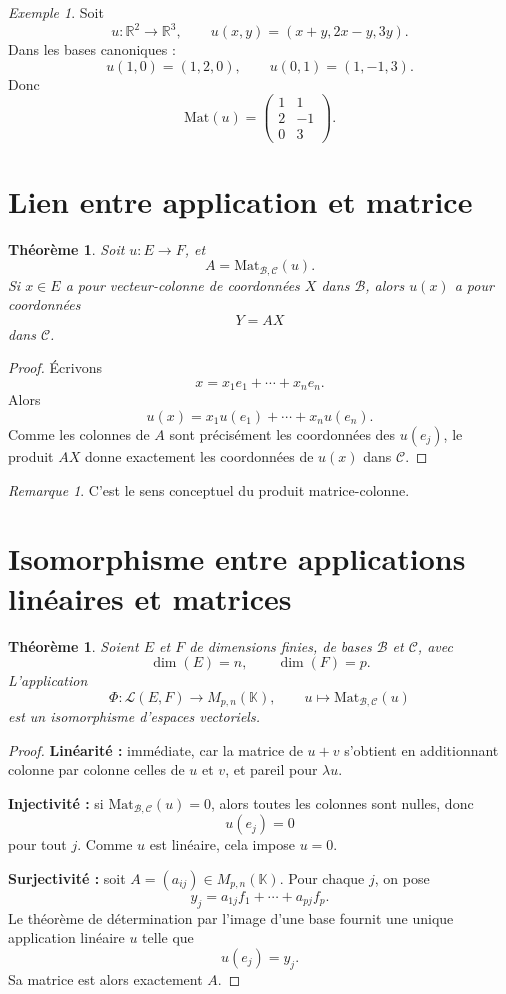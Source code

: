 \documentclass[11pt,a4paper]{article}
\newtheorem{theoreme}[definition]{Théorème}
\theoremstyle{remark}
\newtheorem{remarque}[definition]{Remarque}
\newtheorem{exemple}[definition]{Exemple}
\newcommand{\R}{\mathbb{R}}
\newcommand{\K}{\mathbb{K}}
\newcommand{\Lin}{\mathcal{L}}
\begin{document}
\begin{exemple}
Soit
\[
u:\R^2\to\R^3,\qquad u(x,y)=(x+y,2x-y,3y).
\]
Dans les bases canoniques :
\[
u(1,0)=(1,2,0),\qquad u(0,1)=(1,-1,3).
\]
Donc
\[
\mathrm{Mat}(u)=
\begin{pmatrix}
1 & 1\\
2 & -1\\
0 & 3
\end{pmatrix}.
\]
\end{exemple}

\section{Lien entre application et matrice}

\begin{theoreme}
Soit \(u:E\to F\), et
\[
A=\mathrm{Mat}_{\mathcal B,\mathcal C}(u).
\]
Si \(x\in E\) a pour vecteur-colonne de coordonnées \(X\) dans \(\mathcal B\), alors \(u(x)\) a pour coordonnées
\[
Y=AX
\]
dans \(\mathcal C\).
\end{theoreme}

\begin{proof}
Écrivons
\[
x=x_1e_1+\cdots+x_ne_n.
\]
Alors
\[
u(x)=x_1u(e_1)+\cdots+x_nu(e_n).
\]
Comme les colonnes de \(A\) sont précisément les coordonnées des \(u(e_j)\), le produit \(AX\) donne exactement les coordonnées de \(u(x)\) dans \(\mathcal C\).
\end{proof}

\begin{remarque}
C’est le sens conceptuel du produit matrice-colonne.
\end{remarque}

\section{Isomorphisme entre applications linéaires et matrices}

\begin{theoreme}
Soient \(E\) et \(F\) de dimensions finies, de bases \(\mathcal B\) et \(\mathcal C\), avec
\[
\dim(E)=n,\qquad \dim(F)=p.
\]
L’application
\[
\Phi:\Lin(E,F)\to M_{p,n}(\K),\qquad
u\mapsto \mathrm{Mat}_{\mathcal B,\mathcal C}(u)
\]
est un isomorphisme d’espaces vectoriels.
\end{theoreme}

\begin{proof}
\textbf{Linéarité :} immédiate, car la matrice de \(u+v\) s’obtient en additionnant colonne par colonne celles de \(u\) et \(v\), et pareil pour \(\lambda u\).

\textbf{Injectivité :} si \(\mathrm{Mat}_{\mathcal B,\mathcal C}(u)=0\), alors toutes les colonnes sont nulles, donc
\[
u(e_j)=0
\]
pour tout \(j\). Comme \(u\) est linéaire, cela impose \(u=0\).

\textbf{Surjectivité :} soit \(A=(a_{ij})\in M_{p,n}(\K)\). Pour chaque \(j\), on pose
\[
y_j=a_{1j}f_1+\cdots+a_{pj}f_p.
\]
Le théorème de détermination par l’image d’une base fournit une unique application linéaire \(u\) telle que
\[
u(e_j)=y_j.
\]
Sa matrice est alors exactement \(A\).
\end{proof}
\end{document}
